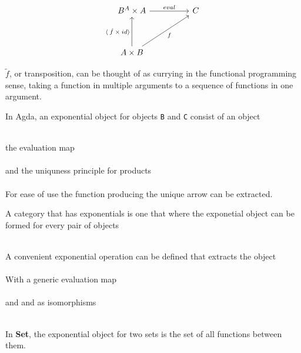 \[\begin{tikzcd}[sep=huge]
    B^{A} \times A \arrow[r, "eval"]
    & C \\
    A \times B \arrow[ru, "f"'] \arrow[u, "\langle \: \hat{f} \: \times \: id
    \rangle"] &
\end{tikzcd}\]

$\tilde{f}$, or transposition, can be thought of as currying in the functional
programming sense, taking a function in multiple arguments to a sequence of
functions in one argument.

In Agda, an exponential object for objects \verb|B| and \verb|C| consist of an
object

\begin{AgdaMultiCode}
\\
the evaluation map
\\
\\
and the uniquness principle for products
\\
\\
For ease of use the function producing the unique arrow can be extracted.\\
\end{AgdaMultiCode}

A category that has exponentials is one that  where the exponetial object can be
formed for every pair of objects

\begin{AgdaMultiCode}
\\
A convenient exponential operation can be defined that extracts the object
\\
\\
With a generic evaluation map
\\
\\
and  and  as isomorphisms
\\
\\
\end{AgdaMultiCode}

In \textbf{Set}, the exponential object for two sets is the set of all functions
between them.
